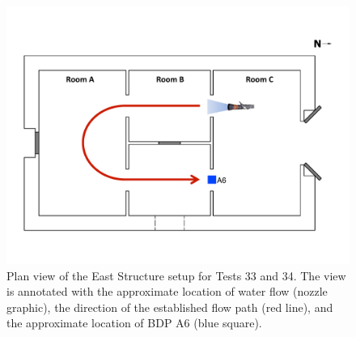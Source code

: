 \documentclass[12pt,oneside]{book}
\begin{document}
\begin{figure}[!ht]
	\includegraphics[width=6in]{../Figures/Floor_Plans/Specific_Tests/East_Hose_Test_Annotated}
	\caption[Plan view of the East Structure setup for Tests 33 and 34.]{Plan view of the East Structure setup for Tests 33 and 34. The view is annotated with the approximate location of water flow (nozzle graphic), the direction of the established flow path (red line), and the approximate location of BDP A6 (blue square).}
	\label{fig:east_setup}
\end{figure}
\end{document}
